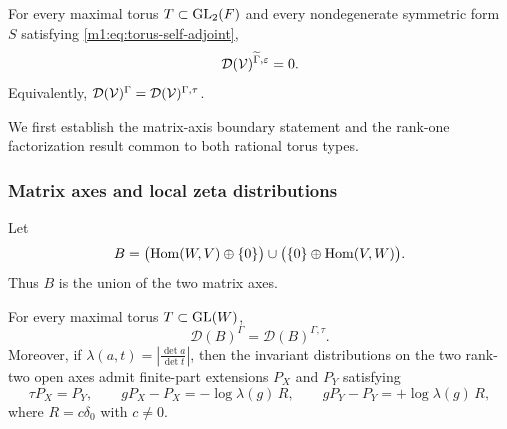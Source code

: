 \begin{theorem}\label{m1:thm:two-leg}
For every maximal torus $T\subset \operatorname{GL}_2(F)$ and every nondegenerate symmetric form $S$ satisfying
\eqref{m1:eq:torus-self-adjoint},
\[
    \mathcal D(\mathcal V)^{\widetilde \Gamma,\varepsilon}=0.
\]
Equivalently, \(\mathcal D(\mathcal V)^\Gamma=\mathcal D(\mathcal V)^{\Gamma,\tau}\). \end{theorem}

We first establish the matrix-axis boundary statement and
the rank-one factorization result common to both rational torus types.

\subsubsection{Matrix axes and local zeta distributions}\label{m1:subsec:matrix-axes}

Let
\[
    B=
    \bigl(\operatorname{Hom}(W,V)\oplus\{0\}\bigr)
    \cup
    \bigl(\{0\}\oplus\operatorname{Hom}(V,W)\bigr).
\]
Thus $B$ is the union of the two matrix axes.

\begin{lemma}\label{m1:lem:matrix-boundary}
For every maximal torus $T\subset \operatorname{GL}(W)$,
\[
    \mathcal D(B)^\Gamma=\mathcal D(B)^{\Gamma,\tau}.
\]
Moreover, if \(\lambda(a,t)=\left|\frac{\det a}{\det t}\right|\), then the invariant distributions on the
two rank-two open axes admit
finite-part extensions $P_X$ and $P_Y$ satisfying
\begin{equation}\label{m1:eq:matrix-finite-parts}
    \tau P_X=P_Y,
    \qquad
    gP_X-P_X=-\log\lambda(g)\,R,
    \qquad
    gP_Y-P_Y=+\log\lambda(g)\,R,
\end{equation}
where $R=c\delta_0$ with $c\neq0$.
\end{lemma}

